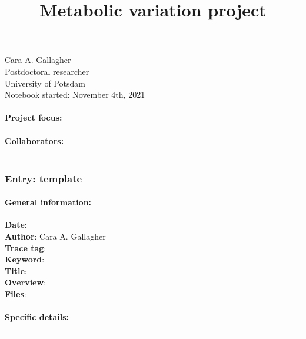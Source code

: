 \documentclass[
]{article}
\title{Metabolic variation project}
\author{}
\date{\vspace{-2.5em}}
\begin{document}
\maketitle

{
\setcounter{tocdepth}{2}
\tableofcontents
}
Cara A. Gallagher\\
Postdoctoral researcher\\
University of Potsdam\\
Notebook started: November 4th, 2021

\hypertarget{project-focus}{%
\paragraph{Project focus:}\label{project-focus}}

\hypertarget{collaborators}{%
\paragraph{Collaborators:}\label{collaborators}}

\begin{center}\rule{0.5\linewidth}{0.5pt}\end{center}

\hypertarget{entry-template}{%
\subsubsection{Entry: template}\label{entry-template}}

\hypertarget{general-information}{%
\paragraph{General information:}\label{general-information}}

\textbf{Date}:\\
\textbf{Author}: Cara A. Gallagher\\
\textbf{Trace tag}:\\
\textbf{Keyword}:\\
\textbf{Title}:\\
\textbf{Overview}:\\
\textbf{Files}:

\hypertarget{specific-details}{%
\paragraph{Specific details:}\label{specific-details}}

\begin{center}\rule{0.5\linewidth}{0.5pt}\end{center}
\end{document}
